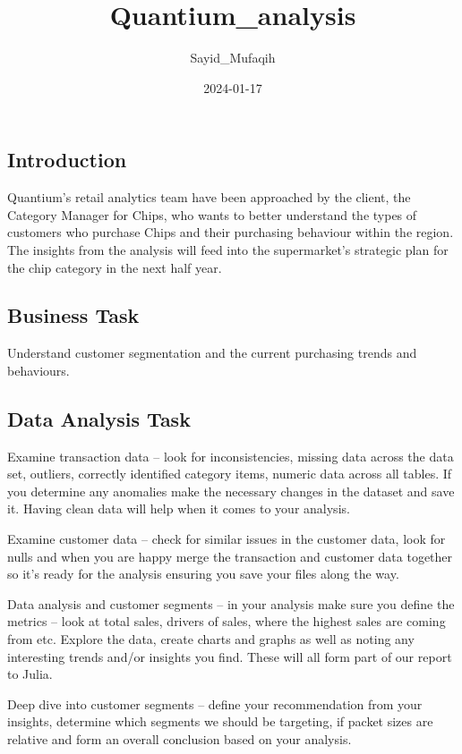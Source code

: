 \documentclass[
]{article}
\title{Quantium\_analysis}
\author{Sayid\_Mufaqih}
\date{2024-01-17}
\begin{document}
\maketitle

\hypertarget{introduction}{%
\subsection{Introduction}\label{introduction}}

Quantium's retail analytics team have been approached by the client, the
Category Manager for Chips, who wants to better understand the types of
customers who purchase Chips and their purchasing behaviour within the
region. The insights from the analysis will feed into the supermarket's
strategic plan for the chip category in the next half year.

\hypertarget{business-task}{%
\subsection{Business Task}\label{business-task}}

Understand customer segmentation and the current purchasing trends and
behaviours.

\hypertarget{data-analysis-task}{%
\subsection{Data Analysis Task}\label{data-analysis-task}}

Examine transaction data -- look for inconsistencies, missing data
across the data set, outliers, correctly identified category items,
numeric data across all tables. If you determine any anomalies make the
necessary changes in the dataset and save it. Having clean data will
help when it comes to your analysis.

Examine customer data -- check for similar issues in the customer data,
look for nulls and when you are happy merge the transaction and customer
data together so it's ready for the analysis ensuring you save your
files along the way.

Data analysis and customer segments -- in your analysis make sure you
define the metrics -- look at total sales, drivers of sales, where the
highest sales are coming from etc. Explore the data, create charts and
graphs as well as noting any interesting trends and/or insights you
find. These will all form part of our report to Julia.

Deep dive into customer segments -- define your recommendation from your
insights, determine which segments we should be targeting, if packet
sizes are relative and form an overall conclusion based on your
analysis.
\end{document}
